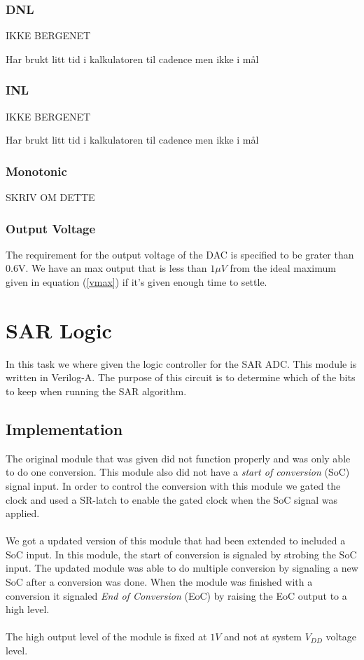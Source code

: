\documentclass[english, 12pt, a4paper]{ifimaster}
\begin{document}
\subsubsection{DNL}

IKKE BERGENET

Har brukt litt tid i kalkulatoren til cadence men ikke i mål


\subsubsection{INL}

IKKE BERGENET

Har brukt litt tid i kalkulatoren til cadence men ikke i mål

\subsubsection{Monotonic}
SKRIV OM DETTE


\subsubsection{Output Voltage}
The requirement for the output voltage of the DAC is specified to be grater than 0.6V. 
We have an max output that is less than \(1\mu V\) from the ideal maximum given in equation (\ref{vmax}) if it's given enough time to settle.





\section{SAR Logic}
In this task we where given the logic controller for the SAR ADC. This module is written in Verilog-A. 
The purpose of this circuit is to determine which of the bits to keep when running the SAR algorithm.

\subsection{Implementation}
The original module that was given did not function properly and was only able to do one conversion. This module also did not have a \textit{start of conversion} (SoC) signal input.
In order to control the conversion with this module we gated the clock and used a SR-latch to enable the gated clock when the SoC signal was applied.\\
\\
We got a updated version of this module that had been extended to included a SoC input. In this module, the start of conversion is signaled by strobing the SoC input.
The updated module was able to do multiple conversion by signaling a new SoC after a conversion was done. 
When the module was finished with a conversion it signaled \textit{End of Conversion} (EoC) by raising the EoC output to a high level. \\
\\
The high output level of the module is fixed at \(1 V\) and not at system \(V_{DD}\) voltage level.
\end{document}
